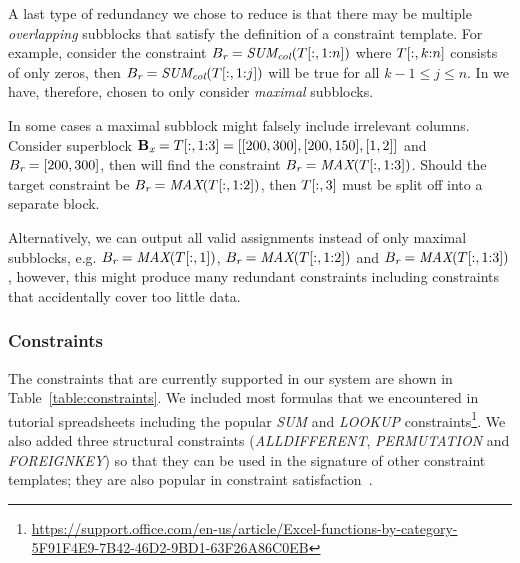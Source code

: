 A last type of redundancy we chose to reduce is that there may be multiple \textit{overlapping} subblocks that satisfy the definition of a constraint template.
For example, consider the constraint $B_{\textit{r}} = \textit{SUM\textsubscript{col}}(T[:,1{:}n])$ where $T[:,k{:}n]$ consists of only zeros, then $B_{\textit{r}} = \textit{SUM\textsubscript{col}}(T[:,1{:}j])$ will be true for all $k - 1 \leq j \leq n$.
In \sname we have, therefore, chosen to only consider \textit{maximal} subblocks.

In some cases a maximal subblock might falsely include irrelevant columns.
Consider superblock $\mathbf{B_{\textit{x}}} = T[:,1{:}3] = [[200, 300], [200, 150], [1, 2]]$ and $B_{\textit{r}} = [200, 300]$, then \sname will find the constraint $B_{\textit{r}} = \textit{MAX}(T[:,1{:}3])$.
Should the target constraint be $B_{\textit{r}} = \textit{MAX}(T[:,1{:}2])$, then $T[:,3]$ must be split off into a separate block.

Alternatively, we can output all valid assignments instead of only maximal subblocks, e.g. $B_{\textit{r}} = \textit{MAX}(T[:,1])$, $B_{\textit{r}} = \textit{MAX}(T[:,1{:}2])$ and $B_{\textit{r}} = \textit{MAX}(T[:,1{:}3])$, however, this might produce many redundant constraints including constraints that accidentally cover too little data.





\subsubsection{Constraints} \label{sec:which_cons}
The constraints that are currently supported in our system are shown in Table~\ref{table:constraints}.
We included most formulas that we encountered in tutorial spreadsheets including the popular \textit{SUM} and \textit{LOOKUP} constraints\footnote{\href{https://support.office.com/en-us/article/Excel-functions-by-category-5F91F4E9-7B42-46D2-9BD1-63F26A86C0EB}{https://support.office.com/en-us/article/Excel-functions-by-category-5F91F4E9-7B42-46D2-9BD1-63F26A86C0EB}}.
We also added three structural constraints (\textit{ALLDIFFERENT}, \textit{PERMUTATION} and \textit{FOREIGNKEY}) so that they can be used in the signature of other constraint templates; they are also popular in constraint satisfaction~\cite{modelseeker}.

